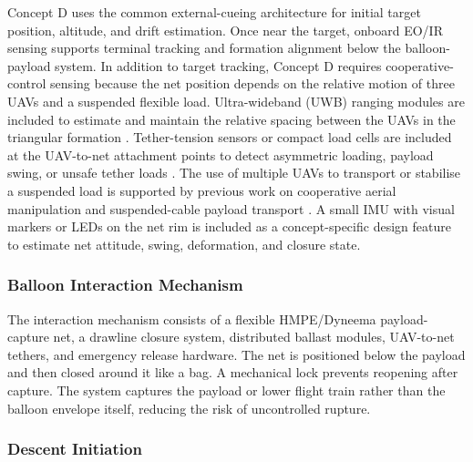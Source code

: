 
Concept D uses the common external-cueing architecture for initial target position, altitude, and drift estimation. Once near the target, onboard EO/IR sensing supports terminal tracking and formation alignment below the balloon-payload system. In addition to target tracking, Concept D requires cooperative-control sensing because the net position depends on the relative motion of three UAVs and a suspended flexible load. Ultra-wideband (UWB) ranging modules are included to estimate and maintain the relative spacing between the UAVs in the triangular formation \cite{Shule2020UWB-BasedSurvey}. Tether-tension sensors or compact load cells are included at the UAV-to-net attachment points to detect asymmetric loading, payload swing, or unsafe tether loads \cite{Prkacin2025TrajectorySystems}. The use of multiple UAVs to transport or stabilise a suspended load is supported by previous work on cooperative aerial manipulation and suspended-cable payload transport \cite{Sun2025AgileLoad,EstevezSanz2024ReviewQuadrotors}. A small IMU with visual markers or LEDs on the net rim is included as a concept-specific design feature to estimate net attitude, swing, deformation, and closure state.



\subsubsection{Balloon Interaction Mechanism}

The interaction mechanism consists of a flexible HMPE/Dyneema payload-capture net, a drawline closure system, distributed ballast modules, UAV-to-net tethers, and emergency release hardware. The net is positioned below the payload and then closed around it like a bag. A mechanical lock prevents reopening after capture. The system captures the payload or lower flight train rather than the balloon envelope itself, reducing the risk of uncontrolled rupture.





\subsubsection{Descent Initiation}

